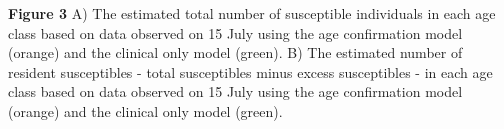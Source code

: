 \textbf{Figure 3} A) The estimated total number of susceptible
individuals in each age class based on data observed on 15 July using
the age confirmation model (orange) and the clinical only model (green).
B) The estimated number of resident susceptibles - total susceptibles
minus excess susceptibles - in each age class based on data observed on
15 July using the age confirmation model (orange) and the clinical only
model (green).